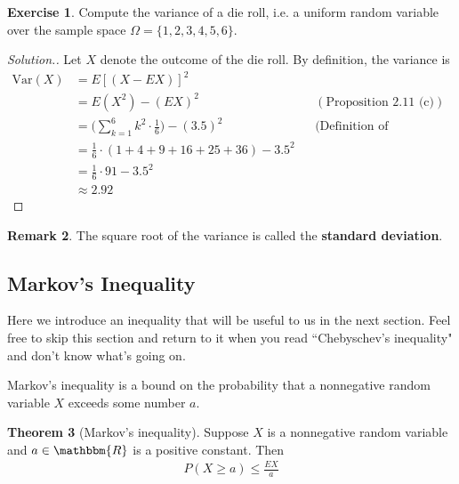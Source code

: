 \documentclass{tufte-book}
\newcommand\real{\mathbbm{R}}
\newcommand\var{\text{Var}}
\theoremstyle{definition}
\newtheorem{theorem}{Theorem}
\numberwithin{theorem}{section}
\numberwithin{definition}{section}
\numberwithin{lemma}{section}
\numberwithin{corollary}{section}
\numberwithin{proposition}{section}
\newtheorem{remark}[theorem]{Remark}
\numberwithin{remark}{section}
\numberwithin{claim}{section}
\numberwithin{observation}{section}
\numberwithin{fact}{section}
\numberwithin{assumption}{section}
\numberwithin{example}{section}
\newtheorem{exercise}[theorem]{Exercise}
\numberwithin{exercise}{section}
\begin{document}
\begin{exercise}
Compute the variance of a die roll, i.e. a uniform random variable over the sample space $\Omega =\{1,2,3,4,5,6\}$.
\end{exercise}
\begin{proof}[Solution.]
Let $X$ denote the outcome of the die roll. By definition, the variance is
\begin{align*}
\var(X) &= E[(X-EX)]^2 \\
&= E(X^2) - (EX)^2 &&(\text{Proposition 2.11 (c)}) \\ 
&= \Big(\sum_{k=1}^6 k^2 \cdot \frac{1}{6} \Big) - (3.5)^2 &&\text{(Definition of Expectation)} \\
&= \frac{1}{6} \cdot (1 + 4 + 9 + 16 + 25 + 36) - 3.5^2 \\
&= \frac{1}{6} \cdot 91 - 3.5^2 \\
&\approx 2.92
\end{align*}

\end{proof}

\begin{remark} The square root of the variance is called the \textbf{standard deviation}.
\end{remark}

\subsection{Markov's Inequality}
Here we introduce an inequality that will be useful to us in the next section. Feel free to skip this section and return to it when you read ``Chebyschev's inequality" and don't know what's going on.

Markov's inequality is a bound on the probability that a nonnegative random variable $X$ exceeds some number $a$. 

\begin{theorem}[Markov's inequality]
Suppose $X$ is a nonnegative random variable and $a \in \real$ is a positive constant. Then
\begin{align*}
P(X \geq a) \leq \frac{EX}{a}
\end{align*}
\end{theorem}
\end{document}
